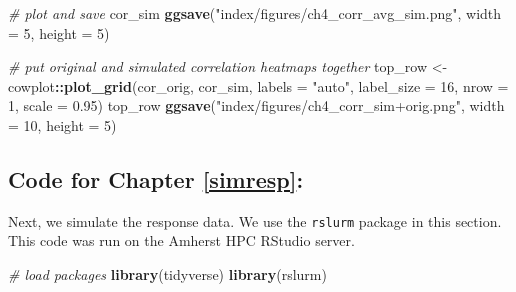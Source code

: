 \documentclass[12pt, twoside]{amherstthesis}
\newenvironment{Shaded}{\begin{snugshade}}{\end{snugshade}}
\newcommand{\AttributeTok}[1]{\textcolor[rgb]{0.13,0.29,0.53}{#1}}
\newcommand{\CommentTok}[1]{\textcolor[rgb]{0.56,0.35,0.01}{\textit{#1}}}
\newcommand{\DecValTok}[1]{\textcolor[rgb]{0.00,0.00,0.81}{#1}}
\newcommand{\FloatTok}[1]{\textcolor[rgb]{0.00,0.00,0.81}{#1}}
\newcommand{\FunctionTok}[1]{\textcolor[rgb]{0.13,0.29,0.53}{\textbf{#1}}}
\newcommand{\NormalTok}[1]{#1}
\newcommand{\OtherTok}[1]{\textcolor[rgb]{0.56,0.35,0.01}{#1}}
\newcommand{\SpecialCharTok}[1]{\textcolor[rgb]{0.81,0.36,0.00}{\textbf{#1}}}
\newcommand{\StringTok}[1]{\textcolor[rgb]{0.31,0.60,0.02}{#1}}
\begin{document}
\begin{Shaded}
\begin{Highlighting}[]
\CommentTok{\# plot and save}
\NormalTok{cor\_sim}
\FunctionTok{ggsave}\NormalTok{(}\StringTok{"index/figures/ch4\_corr\_avg\_sim.png"}\NormalTok{, }\AttributeTok{width =} \DecValTok{5}\NormalTok{, }\AttributeTok{height =} \DecValTok{5}\NormalTok{)}

\CommentTok{\# put original and simulated correlation heatmaps together}
\NormalTok{top\_row }\OtherTok{\textless{}{-}}\NormalTok{ cowplot}\SpecialCharTok{::}\FunctionTok{plot\_grid}\NormalTok{(cor\_orig, cor\_sim, }\AttributeTok{labels =} \StringTok{"auto"}\NormalTok{, }\AttributeTok{label\_size =} \DecValTok{16}\NormalTok{, }
                   \AttributeTok{nrow =} \DecValTok{1}\NormalTok{, }\AttributeTok{scale =} \FloatTok{0.95}\NormalTok{)}
\NormalTok{top\_row}
\FunctionTok{ggsave}\NormalTok{(}\StringTok{"index/figures/ch4\_corr\_sim+orig.png"}\NormalTok{, }\AttributeTok{width =} \DecValTok{10}\NormalTok{, }\AttributeTok{height =} \DecValTok{5}\NormalTok{)}
\end{Highlighting}
\end{Shaded}
\normalsize

\hypertarget{code-for-chapter-refsimresp}{%
\subsection{Code for Chapter \ref{simresp}:}\label{code-for-chapter-refsimresp}}

Next, we simulate the response data. We use the \texttt{rslurm} package in this section. This code was run on the Amherst HPC RStudio server.

\scriptsize
\begin{Shaded}
\begin{Highlighting}[]
\CommentTok{\# load packages}
\FunctionTok{library}\NormalTok{(tidyverse)}
\FunctionTok{library}\NormalTok{(rslurm)}
\end{Highlighting}
\end{Shaded}
\normalsize
\end{document}
